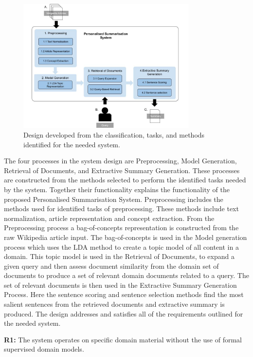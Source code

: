 \begin{figure}[h]
    \centering
         \includegraphics[width=0.80\textwidth]{Figures/System_Design_from_Design_Chapter.jpg}
          \caption{Design developed from the classification, tasks, and methods identified for the needed system.}
           \label{designD}
\end{figure}

The four processes in the system design are Preprocessing, Model Generation, Retrieval of Documents, and Extractive Summary Generation. These processes are constructed from the methods selected to perform the identified tasks needed by the system. Together their functionality explains the functionality of the proposed Personalised Summarisation System. Preprocessing includes the methods used for identified tasks of preprocessing. These methods include text normalization, article representation and concept extraction. From the Preprocessing process a bag-of-concepts representation is constructed from the raw Wikipedia article input. The bag-of-concepts is used in the Model generation process which uses the LDA method to create a topic model of all content in a domain. This topic model is used in the Retrieval of Documents, to expand a given query and then assess document similarity from the domain set of documents to produce a set of relevant domain documents related to a query. The set of relevant documents is then used in the Extractive Summary Generation Process. Here the sentence scoring and sentence selection methods find the most salient sentences from the retrieved documents and extractive summary is produced. The design addresses and satisfies all of the requirements outlined for the needed system.

\textbf{R1:} The system operates on specific domain material without the use of formal supervised domain models.

